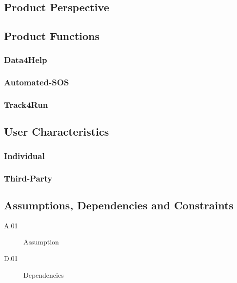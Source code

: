 \documentclass[a4paper]{article}
\begin{document}
    \subsection{Product Perspective}
    
    \subsection{Product Functions}
    
        \subsubsection{Data4Help}
        
        \subsubsection{Automated-SOS}
        
        \subsubsection{Track4Run}
    
    \subsection{User Characteristics}
    
        \subsubsection{Individual}
        
        \subsubsection{Third-Party}
        
    \subsection{Assumptions, Dependencies and Constraints}
        \begin{description}
            \item[A.01] Assumption
        \end{description}
        
        \begin{description}
            \item[D.01] Dependencies
        \end{description}
        
\end{document}
